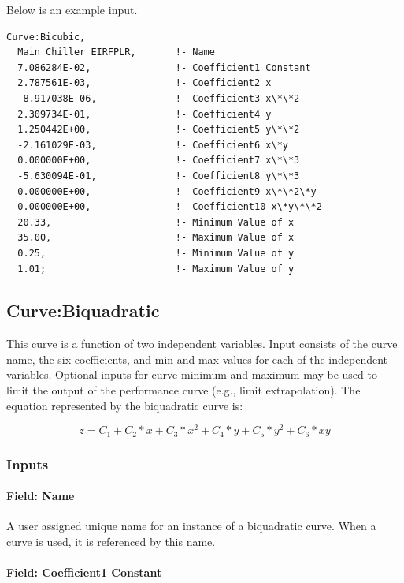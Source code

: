 Below is an example input.

\begin{lstlisting}
Curve:Bicubic,
  Main Chiller EIRFPLR,       !- Name
  7.086284E-02,               !- Coefficient1 Constant
  2.787561E-03,               !- Coefficient2 x
  -8.917038E-06,              !- Coefficient3 x\*\*2
  2.309734E-01,               !- Coefficient4 y
  1.250442E+00,               !- Coefficient5 y\*\*2
  -2.161029E-03,              !- Coefficient6 x\*y
  0.000000E+00,               !- Coefficient7 x\*\*3
  -5.630094E-01,              !- Coefficient8 y\*\*3
  0.000000E+00,               !- Coefficient9 x\*\*2\*y
  0.000000E+00,               !- Coefficient10 x\*y\*\*2
  20.33,                      !- Minimum Value of x
  35.00,                      !- Maximum Value of x
  0.25,                       !- Minimum Value of y
  1.01;                       !- Maximum Value of y
\end{lstlisting}

\subsection{Curve:Biquadratic}\label{curvebiquadratic}

This curve is a function of two independent variables. Input consists of the curve name, the six coefficients, and min and max values for each of the independent variables. Optional inputs for curve minimum and maximum may be used to limit the output of the performance curve (e.g., limit extrapolation). The equation represented by the biquadratic curve is:

\begin{equation}
z = {C_1} + {C_2}*x + {C_3}*{x^2} + {C_4}*y + {C_5}*{y^2} + {C_6}*xy
\end{equation}

\subsubsection{Inputs}\label{inputs-7-016}

\paragraph{Field: Name}\label{field-name-7-012}

A user assigned unique name for an instance of a biquadratic curve. When a curve is used, it is referenced by this name.

\paragraph{Field: Coefficient1 Constant}\label{field-coefficient1-constant-7}

